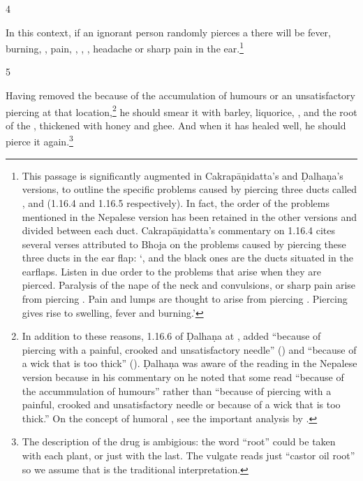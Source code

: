\begin{translation}
\item [4] 
 
In this context, if an ignorant person randomly pierces a 
there will be fever, burning, , pain, ,
, ,
headache or sharp pain in the ear.\footnote{This passage is significantly
    augmented in Cakrapāṇidatta's and Ḍalhaṇa's versions, to outline the specific
    problems caused by piercing three ducts called ,  and
     (1.16.4 \citep[126]{acar-1939} and 1.16.5 \citep[77]{vulgate}
    respectively). In fact, the order of the problems mentioned in the Nepalese
    version has been retained in the other versions and divided between each duct.
    Cakrapāṇidatta's commentary on 1.16.4 \citep[126]{acar-1939} cites several verses
    attributed to Bhoja on the problems caused by piercing these three ducts in the
    ear flap: `,  and the black ones are the ducts
    situated in the earflaps.  Listen in due order to the problems that arise when
    they are pierced. Paralysis of the nape of the neck and convulsions, or sharp pain
    arise from piercing . Pain and lumps are thought to arise from
    piercing . Piercing  gives rise to swelling, fever and
    burning.'}
    
\item[5]     
    
Having removed the  because of the accumulation of
humours or an unsatisfactory piercing at that location,\footnote{In addition to these reasons,
    1.16.6 of Ḍalhaṇa at , added “because of piercing with a painful,
    crooked and unsatisfactory needle” () and 
    “because of a wick that is too thick” (). Ḍalhaṇa was
    aware of the reading in the Nepalese version because in his commentary on
     he noted that some read “because of the accummulation of humours”
    rather than “because of piercing with a painful, crooked and unsatisfactory needle
    or because of a wick that is too thick.” On the concept of humoral
    , see the important analysis by \citet{meul-1992}.} he
    should smear it with barley, liquorice, ,
    and the root of the , thickened with honey and
    ghee. And when it has healed well, he should pierce it again.\footnote{The
        description of the drug is ambigious: the word “root” could be taken with each
        plant, or just with the last.  The vulgate reads just “castor oil root” so we
        assume that is the traditional interpretation.}
    

\end{translation}
